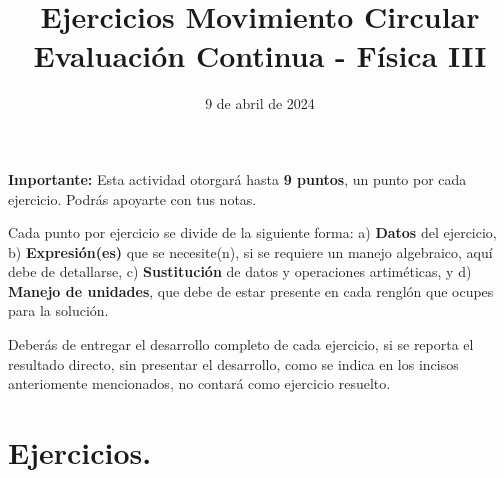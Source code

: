 \documentclass[14pt]{extarticle}
\title{\vspace*{-2cm} Ejercicios Movimiento Circular \\  Evaluación Continua - Física III\vspace{-5ex}}
\date{9 de abril de 2024}
\begin{document}
\maketitle

\vspace*{0.75cm}
\textbf{Importante: } Esta actividad otorgará hasta \textbf{9 puntos}, un punto por cada ejercicio. Podrás apoyarte con tus notas.

Cada punto por ejercicio se divide de la siguiente forma: a) \textbf{Datos} del ejercicio, b) \textbf{Expresión(es)} que se necesite(n), si se requiere un manejo algebraico, aquí debe de detallarse, c) \textbf{Sustitución} de datos y operaciones artiméticas, y d) \textbf{Manejo de unidades}, que debe de estar presente en cada renglón que ocupes para la solución.

Deberás de entregar el desarrollo completo de cada ejercicio, si se reporta el resultado directo, sin presentar el desarrollo, como se indica en los incisos anteriomente mencionados, no contará como ejercicio resuelto.

\section{Ejercicios.}
\end{document}
